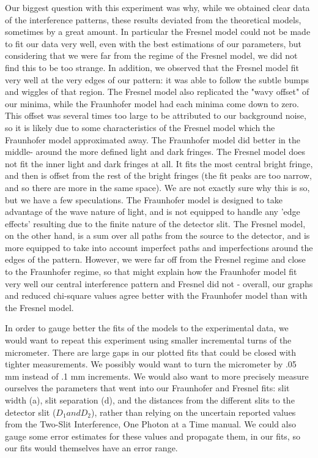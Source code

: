 \documentclass[prb,preprint]{revtex4-1}
\begin{document}
Our biggest question with this experiment was why, while we obtained clear data of the interference patterns, these results deviated from the theoretical models, sometimes by a great amount.  In particular the Fresnel model could not be made to fit our data very well, even with the best estimations of our parameters, but considering that we were far from the regime of the Fresnel model, we did not find this to be too strange. In addition, we observed that the Fresnel model fit very well at the very edges of our pattern:  it was able to follow the subtle bumps and wiggles of that region.  The Fresnel model also replicated the "wavy offset" of our minima, while the Fraunhofer model had each minima come down to zero.  This offset was several times too large to be attributed to our background noise, so it is likely due to some characteristics of the Fresnel model which the Fraunhofer model approximated away.  The Fraunhofer model did better in the middle- around the more defined light and dark fringes.  The Fresnel model does not fit the inner light and dark fringes at all.  It fits the most central bright fringe, and then is offset from the rest of the bright fringes (the fit peaks are too narrow, and so there are more in the same space).  We are not exactly sure why this is so, but we have a few speculations.    The Fraunhofer model is designed to take advantage of the wave nature of light, and is not equipped to handle any 'edge effects' resulting due to the finite nature of the detector slit.  The Fresnel model, on the other hand, is a sum over all paths from the source to the detector, and is more equipped to take into account imperfect paths and imperfections around the edges of the pattern.   However, we were far off from the Fresnel regime and close to the Fraunhofer regime, so that might explain how the Fraunhofer model fit very well our central interference pattern and Fresnel did not - overall, our graphs and reduced chi-square values agree better with the Fraunhofer model than with the Fresnel model.  \cite{teachspin}

In order to gauge better the fits of the models to the experimental data, we would want to repeat this experiment using smaller incremental turns of the micrometer.  There are large gaps in our plotted fits that could be closed with tighter measurements.  We possibly would want to turn the micrometer by .05 mm instead of .1 mm increments.  We would also want to more precisely measure ourselves the parameters that went into our Fraunhofer and Fresnel fits:  slit width (a), slit separation (d), and the distances from the different slits to the detector slit ($D_{1} and D_{2}$), rather than relying on the uncertain reported values from the Two-Slit Interference, One Photon at a Time manual.  We could also gauge some error estimates for these values and propagate them, in our fits, so our fits would themselves have an error range.
\end{document}
